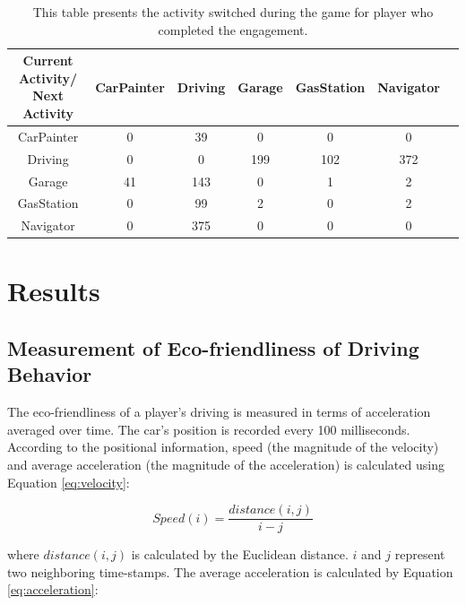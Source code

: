 \documentclass[preprint,authoryear,12pt]{elsarticle}
\begin{document}
\begin{table}[!htb]
	\renewcommand*{\arraystretch}{1.4}
	\caption{This table presents the activity switched during the game for player who completed the engagement.}
	\begin{center}
		\begin{tabular}{c|c|c|c|c|c|c}
			Current Activity/ Next Activity & CarPainter & Driving & Garage & GasStation &  Navigator\\
			\hline
			CarPainter &	0&	39&	0&	0&	0\\
			
			Driving & 0	 & 0&	199&	102&	372\\
			
			Garage& 41&	143&	0&	1&	2 \\
			
			GasStation& 	0&	99&	2&	0&	2 \\
			
			Navigator& 0&	375&	0&	0&	0 \\
			
		\end{tabular}
	\end{center}
	\label{T:Activityswitch}
\end{table}



\section{Results}
\label{sec:result}

\subsection{Measurement of Eco-friendliness of Driving Behavior}
\label{sec:measureEco}

The eco-friendliness of a player's driving is measured in terms of acceleration averaged over time.  The car's position is recorded every 100 milliseconds. According to the positional information, speed (the magnitude of the velocity) and average acceleration (the magnitude of the acceleration) is calculated using Equation \ref{eq:velocity}:

\begin{equation}\label{eq:velocity}
Speed(i) = \frac{distance(i,j)}{i-j}
\end{equation}

where $distance(i,j)$ is calculated by the Euclidean distance. $i$ and $j$ represent two neighboring time-stamps. The average acceleration is calculated by Equation \ref{eq:acceleration}:
\end{document}
